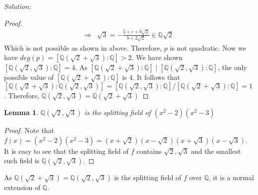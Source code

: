 \documentclass[a4paper, 11pt]{article}
\newenvironment{solution}
    {\textit{Solution:}}
    {}
\newtheorem{lemma}[theorem]{Lemma}
\begin{document}
\begin{solution}
\begin{proof}
\begin{align*}
            \Rightarrow&\sqrt3=-\frac{5+c+b\sqrt2}{b+2\sqrt2}\in\mathbb{Q}\sqrt2
        \end{align*}
        Which is not possible as shown in above. Therefore, $p$ is not quadratic. Now we have $deg(p)=[\mathbb Q(\sqrt2+\sqrt3):\mathbb Q]>2$. We have shown $[\mathbb Q(\sqrt2,\sqrt3):\mathbb Q]=4$. As $[\mathbb Q(\sqrt2+\sqrt3):\mathbb Q]\mid[\mathbb Q(\sqrt2,\sqrt3):\mathbb Q]$, the only possible value of $[\mathbb Q(\sqrt2+\sqrt3):\mathbb Q]$ is  4. It follows that $[\mathbb Q(\sqrt2+\sqrt3):\mathbb Q(\sqrt2,\sqrt3)]=[\mathbb Q(\sqrt2,\sqrt3):\mathbb Q]/[\mathbb Q(\sqrt2+\sqrt3):\mathbb Q]=1$. Therefore, $\mathbb{Q}(\sqrt2,\sqrt3)=\mathbb{Q}(\sqrt 2+\sqrt 3)$
    \end{proof}
    \begin{lemma}
        $\mathbb{Q}(\sqrt{2},\sqrt{3})$ is the splitting field of $(x^2-2)(x^2-3)$
    \end{lemma}
    \begin{proof}
        Note that $f(x)=(x^2-2)(x^2-3)=(x+\sqrt{2})(x-\sqrt{2})(x+\sqrt{3})(x-\sqrt{3})$. It is easy to see that the splitting field of $f$ contains $\sqrt{2},\sqrt{3}$ and the smallest such field is $\mathbb{Q}(\sqrt{2},\sqrt{3})$.
    \end{proof}\noindent
As $\mathbb{Q}(\sqrt{2}+\sqrt{3})=\mathbb{Q}(\sqrt{2},\sqrt{3})$ is the splitting field of $f$ over $\mathbb Q$, it is a normal extension of $\mathbb{Q}$.
\end{solution}
\end{document}
